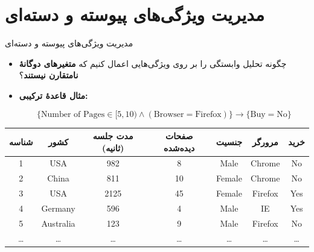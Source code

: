 \section{مدیریت ویژگی‌های پیوسته و دسته‌ای}

\begin{frame}{مدیریت ویژگی‌های پیوسته و دسته‌ای}{}
\begin{itemize}\setlength{\itemsep}{5pt}
    \item چگونه تحلیل وابستگی را بر روی ویژگی‌هایی اعمال کنیم که \textbf{متغیرهای دوگانهٔ نامتقارن نیستند}؟
    \item \textbf{مثال قاعدهٔ ترکیبی:}
    \begin{center}
    \begin{latin}
    \[
    \{\text{Number of Pages} \in [5,10) \wedge (\text{Browser}=\text{Firefox})\} \to \{\text{Buy} = \text{No}\}
    \]
    \end{latin}
    \end{center}
\end{itemize}

\vspace{0.1cm}
\begin{center}
\setlength{\tabcolsep}{3pt}
\fontsize{7.5}{9.5}\selectfont
\begin{tabular}{|c|c|c|c|c|c|c|}
\hline
\rowcolor{mannheimblue!15}
\textbf{شناسه} & \textbf{کشور} & \textbf{مدت جلسه (ثانیه)} & \textbf{صفحات دیده‌شده} & \textbf{جنسیت} & \textbf{مرورگر} & \textbf{خرید} \\ \hline
1 & USA & 982 & 8 & Male & Chrome & No \\ \hline
2 & China & 811 & 10 & Female & Chrome & No \\ \hline
3 & USA & 2125 & 45 & Female & Firefox & Yes \\ \hline
4 & Germany & 596 & 4 & Male & IE & Yes \\ \hline
5 & Australia & 123 & 9 & Male & Firefox & No \\ \hline
\dots & \dots & \dots & \dots & \dots & \dots & \dots \\ \hline
\end{tabular}
\end{center}
\end{frame}

